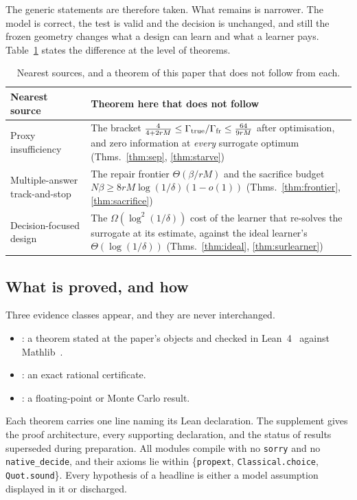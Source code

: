 The generic statements are therefore taken. What remains is narrower. The model is correct,
the test is valid and the decision is unchanged, and still the frozen geometry changes what a
design can learn and what a learner pays. Table~\ref{tab:prior} states the difference at the
level of theorems.

\begin{table}[h]
\caption{Nearest sources, and a theorem of this paper that does not follow from each.}
\label{tab:prior}
\centering
\footnotesize
\begin{tabular}{@{}p{}p{}@{}}
\toprule
Nearest source & Theorem here that does not follow \\
\midrule
Proxy insufficiency~\cite{schutte2026,overstall2022} & The bracket
$\frac{4}{4+2rM}\le\Gamma_{\rm true}/\Gamma_{\rm fr}\le\frac{64}{9rM}$ after optimisation, and
zero information at \emph{every} surrogate optimum (Thms.~\ref{thm:sep},
\ref{thm:starve}) \\
Multiple-answer track-and-stop~\cite{degenne2019} & The repair frontier
$\Theta(\beta/rM)$ and the sacrifice budget $N\beta\ge8rM\log(1/\delta)(1-o(1))$
(Thms.~\ref{thm:frontier}, \ref{thm:sacrifice}) \\
Decision-focused design~\cite{wan2026} & The $\Omega(\log^{2}(1/\delta))$ cost of the
learner that re-solves the surrogate at its estimate, against the ideal learner's
$\Theta(\log(1/\delta))$ (Thms.~\ref{thm:ideal}, \ref{thm:surlearner}) \\
\bottomrule
\end{tabular}
\end{table}

\subsection{What is proved, and how}

Three evidence classes appear, and they are never interchanged.
\begin{itemize}
\item \PROVED: a theorem stated at the paper's objects and checked in
Lean~4~\cite{demoura2021} against Mathlib~\cite{mathlib2020}.
\item \CERT: an exact rational certificate.
\item \NUM: a floating-point or Monte Carlo result.
\end{itemize}
Each theorem carries one line naming its Lean declaration. The supplement gives the proof
architecture, every supporting declaration, and the status of results superseded during
preparation. All modules compile with no \texttt{sorry} and no \texttt{native\_decide}, and
their axioms lie within \{\texttt{propext}, \texttt{Classical.choice}, \texttt{Quot.sound}\}.
Every hypothesis of a headline is either a model assumption displayed in it or discharged.

